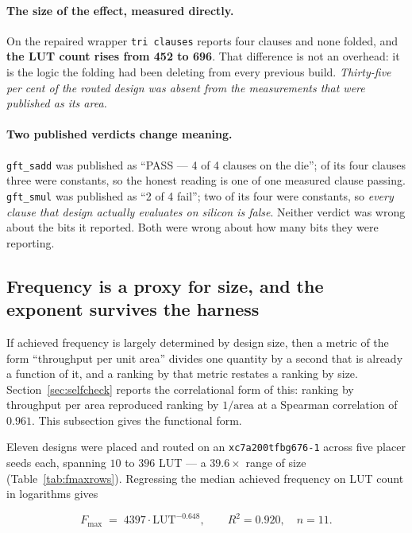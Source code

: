 \paragraph{The size of the effect, measured directly.} On the repaired wrapper
\texttt{tri clauses} reports four clauses and none folded, and
\textbf{the LUT count rises from 452 to 696}. That difference is not an
overhead: it is the logic the folding had been deleting from every previous
build. \emph{Thirty-five per cent of the routed design was absent from the
measurements that were published as its area.}

\paragraph{Two published verdicts change meaning.} \texttt{gft\_sadd} was
published as ``PASS --- 4 of 4 clauses on the die''; of its four clauses three
were constants, so the honest reading is one of one measured clause passing.
\texttt{gft\_smul} was published as ``2 of 4 fail''; two of its four were
constants, so \emph{every clause that design actually evaluates on silicon is
false}. Neither verdict was wrong about the bits it reported. Both were wrong
about how many bits they were reporting.

\subsection{Frequency is a proxy for size, and the exponent survives the harness}
\label{sec:fmaxlaw}

If achieved frequency is largely determined by design size, then a metric of the
form ``throughput per unit area'' divides one quantity by a second that is
already a function of it, and a ranking by that metric restates a ranking by
size. Section~\ref{sec:selfcheck} reports the correlational form of this:
ranking by throughput per area reproduced ranking by $1/\text{area}$ at a
Spearman correlation of $0.961$. This subsection gives the functional form.

Eleven designs were placed and routed on an \texttt{xc7a200tfbg676-1} across
five placer seeds each, spanning $10$ to $396$ LUT --- a $39.6\times$ range of
size (Table~\ref{tab:fmaxrows}). Regressing the median achieved frequency on LUT
count in logarithms gives

\begin{equation}
F_{\max} \;=\; 4397\cdot \mathrm{LUT}^{-0.648},\qquad R^2 = 0.920,\quad n=11 .
\label{eq:fmaxlaw}
\end{equation}

